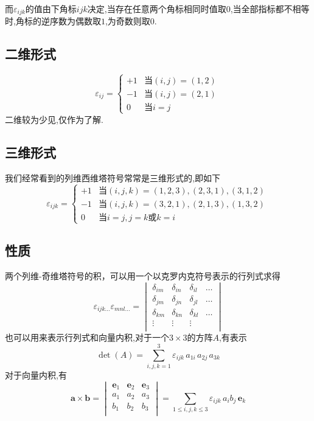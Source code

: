 \documentclass[lang=cn,newtx,10pt,scheme=chinese,thmcnt=section]{elegantbook}
\begin{document}
而$\varepsilon_{ijk}$的值由下角标$ijk$决定,当存在任意两个角标相同时值取$0$,当全部指标都不相等时,角标的逆序数为偶数取$1$,为奇数则取$0$.
\subsection*{二维形式}
\begin{equation}
	\varepsilon_{ij}={
		\begin{cases}+1&\text{当}\left(i,j\right)=\left(1,2\right)\\
			-1&\text{当}\left(i,j\right)=\left(2,1\right)\\
			0&\text{当}i=j
		\end{cases}
	}\,
\end{equation}
二维较为少见,仅作为了解.
\subsection*{三维形式}
我们经常看到的列维西维塔符号常常是三维形式的,即如下
\begin{equation}
	\varepsilon _{ijk}={
		\begin{cases}
			+1&\text{当}(i,j,k)=(1,2,3),(2,3,1),(3,1,2)\\
			-1&\text{当}(i,j,k)=(3,2,1),(2,1,3),(1,3,2)\\
			0&\text{当}i=j,j=k\text{或}k=i
			\end{cases}
		}\,
\end{equation}
\subsection*{性质}
两个列维-奇维塔符号的积，可以用一个以克罗内克符号表示的行列式求得
\begin{equation}
	\varepsilon _{ijk\dots }\varepsilon _{mnl\dots }={\begin{vmatrix}\delta _{im}&\delta _{in}&\delta _{il}&\dots \\\delta _{jm}&\delta _{jn}&\delta _{jl}&\dots \\\delta _{km}&\delta _{kn}&\delta _{kl}&\dots \\\vdots &\vdots &\vdots \\\end{vmatrix}}
\end{equation}
也可以用来表示行列式和向量内积,对于一个$3\times3$的方阵$A$,有表示
\begin{equation}
	\det(A)=\sum _{i,j,k=1}^{3}\varepsilon _{ijk}\,a_{1i}\,a_{2j}\,a_{3k}
\end{equation}
对于向量内积,有
\begin{equation}
	{\boldsymbol {a}}\times {\boldsymbol {b}}={\begin{vmatrix}{\boldsymbol {e}}_{1}&{\boldsymbol {e}}_{2}&{\boldsymbol {e}}_{3}\\a_{1}&a_{2}&a_{3}\\b_{1}&b_{2}&b_{3}\\\end{vmatrix}}=\sum _{1\leq i,j,k\leq 3}\varepsilon _{ijk}\,a_{i}b_{j}\,{\boldsymbol {e}}_{k}
\end{equation}
\end{document}
